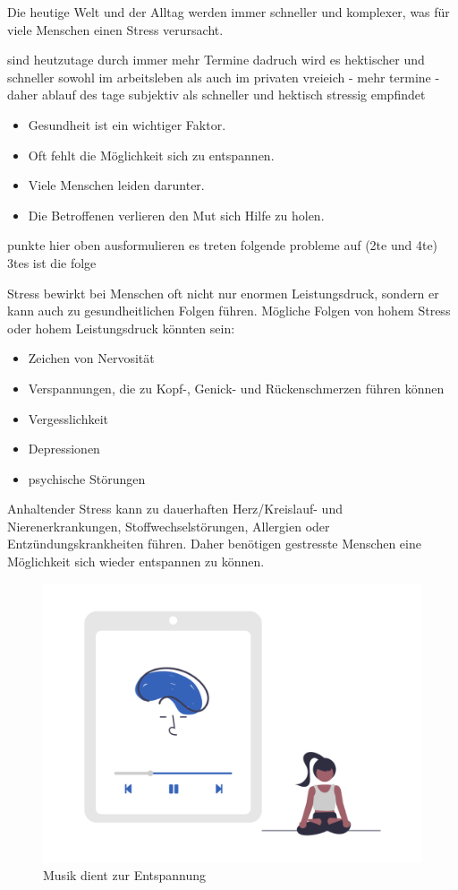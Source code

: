 
Die heutige Welt und der Alltag werden immer schneller und komplexer,
was für viele Menschen einen Stress verursacht.

sind heutzutage durch immer mehr Termine dadruch wird es hektischer und schneller
sowohl im arbeitsleben als auch im privaten vreieich - mehr termine - daher ablauf des tage subjektiv als schneller
und hektisch stressig empfindet

\begin{itemize}
    \item Gesundheit ist ein wichtiger Faktor.
    \item Oft fehlt die Möglichkeit sich zu entspannen.
    \item Viele Menschen leiden darunter.
    \item Die Betroffenen verlieren den Mut sich Hilfe zu holen.
\end{itemize}

punkte hier oben ausformulieren
es treten folgende probleme auf (2te und 4te) 3tes ist die folge

Stress bewirkt bei Menschen oft nicht nur enormen Leistungsdruck, sondern er kann auch zu gesundheitlichen
Folgen führen. Mögliche Folgen von hohem Stress oder hohem Leistungsdruck könnten sein:

\begin{itemize}
    \item Zeichen von Nervosität
    \item Verspannungen, die zu Kopf-, Genick- und Rückenschmerzen führen können
    \item Vergesslichkeit
    \item Depressionen
    \item psychische Störungen
\end{itemize}

Anhaltender Stress kann zu dauerhaften Herz/Kreislauf- und Nierenerkrankungen, Stoffwechselstörungen, Allergien oder
Entzündungskrankheiten führen. \cite{stress} Daher benötigen gestresste Menschen eine Möglichkeit sich
wieder entspannen zu können.

\begin{figure}[H]
    \centering
    \includegraphics[height=0.35\textwidth]{./pics/undraw_Meditating_re_aiqa.png}
    \caption{Musik dient zur Entspannung}
\end{figure}

